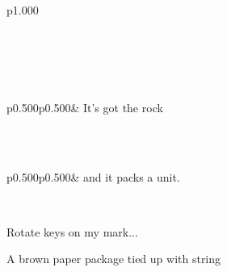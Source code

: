 \label{Ocamlary--module-ExtMod}\label{Ocamlary-ExtMod}\begin{ocamlindent}\label{Ocamlary-ExtMod--type-t}\\
\label{Ocamlary-ExtMod--extension-decl-Leisureforce}\\
\begin{ocamltabular}{p{1.000\textwidth}}\label{Ocamlary-ExtMod--extension-Leisureforce}\\
\end{ocamltabular}%
\\
\end{ocamlindent}%
\\
\label{Ocamlary--extension-decl-ZzzTop0}\\
\begin{ocamltabular}{p{0.500\textwidth}p{0.500\textwidth}}\label{Ocamlary--extension-ZzzTop0}& It's got the rock\\
\end{ocamltabular}%
\\
\label{Ocamlary--extension-decl-ZzzTop}\\
\begin{ocamltabular}{p{0.500\textwidth}p{0.500\textwidth}}\label{Ocamlary--extension-ZzzTop}& and it packs a unit.\\
\end{ocamltabular}%
\\
\label{Ocamlary--val-launch_missiles}\begin{ocamlindent}Rotate keys on my mark...\end{ocamlindent}%
\medbreak
\label{Ocamlary--type-my_mod}\begin{ocamlindent}A brown paper package tied up with string\end{ocamlindent}%
